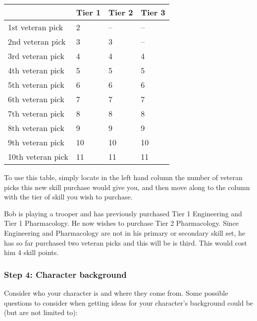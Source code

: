 \begin{table}[H]
\begin{tabular}{|l|l|l|l|} \hline 
 & Tier 1 & Tier 2 & Tier 3 \\
 \hline 1st veteran pick & 2 & -- & -- \\
 \hline 2nd veteran pick & 3 & 3 & -- \\
 \hline 3rd veteran pick & 4 & 4 & 4 \\
 \hline 4th veteran pick & 5 & 5 & 5 \\
 \hline 5th veteran pick & 6 & 6 & 6 \\
 \hline 6th veteran pick & 7 & 7 & 7 \\
 \hline 7th veteran pick & 8 & 8 & 8 \\
 \hline 8th veteran pick & 9 & 9 & 9 \\
 \hline 9th veteran pick & 10 & 10 & 10 \\
 \hline 10th veteran pick & 11 & 11 & 11 \\
 \hline \end{tabular}

\end{table}

To use this table, simply locate in the left hand column the number of veteran picks this new skill purchase would give you, and then move along to the column with the tier of skill you wish to purchase.

Bob is playing a trooper and has previously purchased Tier 1 Engineering and Tier 1 Pharmacology. He now wishes to purchase Tier 2 Pharmacology. Since Engineering and Pharmacology are not in his primary or secondary skill set, he has so far purchased two veteran picks and this will be is third. This would cost him 4 skill points.

\subsubsection{Step 4: Character background}

Consider who your character is and where they come from. Some possible questions to consider when getting ideas for your character's background could be (but are not limited to):

